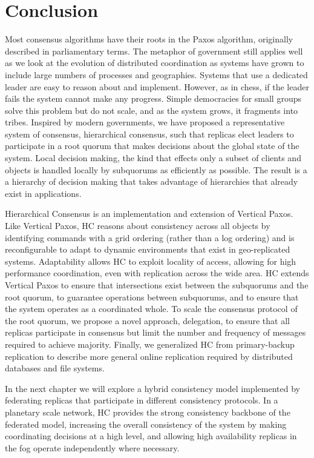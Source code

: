 \section{Conclusion}
\label{ch03_conclusion}

Most consensus algorithms have their roots in the Paxos algorithm, originally described in parliamentary terms.
The metaphor of government still applies well as we look at the evolution of distributed coordination as systems have grown to include large numbers of processes and geographies.
Systems that use a dedicated leader are easy to reason about and implement. However, as in chess, if the leader fails the system cannot make any progress.
Simple democracies for small groups solve this problem but do not scale, and as the system grows, it fragments into tribes.
Inspired by modern governments, we have proposed a representative system of consensus, hierarchical consensus, such that replicas elect leaders to participate in a root quorum that makes decisions about the global state of the system.
Local decision making, the kind that effects only a subset of clients and objects is handled locally by subquorums as efficiently as possible.
The result is a a hierarchy of decision making that takes advantage of hierarchies that already exist in applications.

Hierarchical Consensus is an implementation and extension of Vertical Paxos.
Like Vertical Paxos, HC reasons about consistency across all objects by identifying commands with a grid ordering (rather than a log ordering) and is reconfigurable to adapt to dynamic environments that exist in geo-replicated systems.
Adaptability allows HC to exploit locality of access, allowing for high performance coordination, even with replication across the wide area.
HC extends Vertical Paxos to ensure that intersections exist between the subquorums and the root quorum, to guarantee operations between subquorums, and to ensure that the system operates as a coordinated whole.
To scale the consensus protocol of the root quorum, we propose a novel approach, delegation, to ensure that all replicas participate in consensus but limit the number and frequency of messages required to achieve majority.
Finally, we generalized HC from primary-backup replication to describe more general online replication required by distributed databases and file systems.

In the next chapter we will explore a hybrid consistency model implemented by federating replicas that participate in different consistency protocols.
In a planetary scale network, HC provides the strong consistency backbone of the federated model, increasing the overall consistency of the system by making coordinating decisions at a high level, and allowing high availability replicas in the fog operate independently where necessary.
